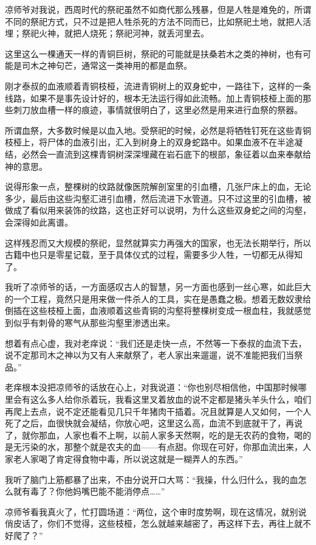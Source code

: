 凉师爷对我说，西周时代的祭祀虽然不如商代那么残暴，但是人牲是难免的，所谓不同的祭祀方式，只不过是把人牲杀死的方法不同而已，比如祭祀土地，就把人活埋；祭祀火神，就把人烧死；祭祀河神，就丢河里去。

这里这么一棵通天一样的青铜巨树，祭祀的可能就是扶桑若木之类的神树，也有可能是司木之神句芒，通常这一类神用的都是血祭。

刚才泰叔的血液顺着青铜枝桠，流进青铜树上的双身蛇中，一路往下，这样的一条线路，如果不是事先设计好的，根本无法运行得如此流畅。加上青铜枝桠上面的那些刺刀放血槽一样的痕迹，事情就很明白了，这里必然是用来进行血祭的祭器。

所谓血祭，大多数时候是以血入地。受祭祀的时候，必然是将牺牲钉死在这些青铜枝桠上，将尸体的血液引出，汇入到树身上的双身蛇路中。如果血液不在半途凝结，必然会一直流到这棵青铜树深深埋藏在岩石底下的根部，象征着以血来奉献给神的意思。

说得形象一点，整棵树的纹路就像医院解剖室里的引血槽，几张尸床上的血，无论多少，最后由这些沟壑汇进引血槽，然后流进下水管道。只不过这里的引血槽，被做成了看似用来装饰的纹路，这也正好可以说明，为什么这些双身蛇之间的沟壑，会深得如此离谱。

这样残忍而又大规模的祭祀，显然就算实力再强大的国家，也无法长期举行，所以古籍中也只是零星记载，至于具体仪式的过程，需要多少人牲，一切都无从得知了。

我听了凉师爷的话，一方面感叹古人的智慧，另一方面也感到一丝心寒，如此巨大的一个工程，竟然只是用来做一件杀人的工具，实在是愚蠢之极。想着无数奴隶给倒插在这些枝桠上面，血液顺着这些青铜的沟壑将整棵树变成一根血柱，我就感觉到似乎有刺骨的寒气从那些沟壑里渗透出来。

想着有点心虚，我对老痒说：“我们还是走快一点，不然等一下泰叔的血流下去，说不定那司木之神以为又有人来献祭了，老人家出来遛遛，说不准能把我们当祭品。”

老痒根本没把凉师爷的话放在心上，对我说道：“你也别尽相信他，中国那时候哪里会有这么多人给你杀着玩，我看这里叉着放血的说不定都是猪头羊头什么，咱们再爬上去点，说不定还能看见几只千年猪肉干插着。况且就算是人又如何，一个人死了之后，血很快就会凝结，你放心吧，这里这么高，血流不到底就干了，再说了，就你那血，人家也看不上啊，以前人家多天然啊，吃的是无农药的食物，喝的是无污染的水，那整个就是农夫的血——有点甜。你现在可好，你那血流出来，人家老人家喝了肯定得食物中毒，所以说这就是一糊弄人的东西。”

我听了脑门上筋都暴了出来，不由分说开口大骂：“我操，什么归什么，我的血怎么就有毒了？你他妈嘴巴能不能消停点……”

凉师爷看我真火了，忙打圆场道：“两位，这个审时度势啊，现在这情况，就别说俏皮话了，你们不觉得，这些枝桠，怎么就越来越密了，再这样下去，再往上就不好爬了？”

